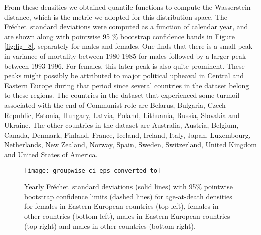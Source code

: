 \documentclass[lineno]{biometrika}
\def\F{Fr\'{e}chet}
\begin{document}
From these densities we obtained %
quantile functions to compute  the Wasserstein distance, which is the metric we adopted for this distribution space.  The  \F \ standard deviations were  computed as a function of calendar year, and  are shown  along with pointwise 95 \% bootstrap confidence bands  in Figure \ref{fig:fig_8}, separately for males and females. One finds  that there is a small peak in variance of mortality between 1980-1985 for males followed by a larger peak between 1993-1996. For females, this later peak is also quite  prominent. These peaks might possibly be attributed to major political upheaval in Central and Eastern Europe during that period since several countries in the  dataset belong to these regions. %
The countries in the dataset that experienced  some turmoil associated with the end of Communist role are Belarus, Bulgaria, Czech Republic, Estonia, Hungary, Latvia, Poland, Lithuania, Russia, Slovakia and Ukraine. {The other countries in the dataset are Australia, Austria, Belgium, Canada, Denmark, Finland, France, Iceland, Ireland, Italy, Japan, Luxembourg, Netherlands, New Zealand, Norway, Spain, Sweden, Switzerland, United Kingdom and United States of America.}

\begin{figure}
	\centering
	\texttt{[image: groupwise\_ci-eps-converted-to]}
	\caption{Yearly \F \ standard deviations (solid lines)  with 95\% pointwise bootstrap confidence limits (dashed lines) for age-at-death densities for females in Eastern European countries (top left), females  in other countries (bottom left), males in Eastern European countries (top right) and males in other countries (bottom right).}
	\label{fig:fig_9}
\end{figure}
\end{document}
